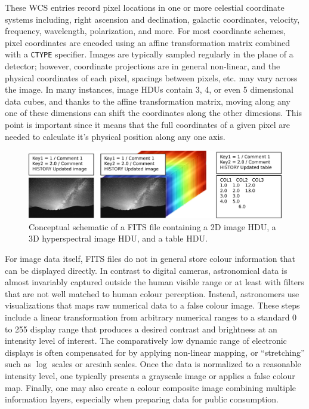 \documentclass{juliacon}
\begin{document}
These WCS entries record pixel locations in one or more celestial coordinate systems including, right ascension and declination, galactic coordinates, velocity, frequency, wavelength, polarization, and more.
For most coordinate schemes, pixel coordinates are encoded using an affine transformation matrix combined with a \verb|CTYPE| specifier. Images are typically sampled regularly in the plane of a detector; however, coordinate projections are in general non-linear, and the physical coordinates of each pixel, spacings between pixels, etc. may vary across the image.
In many instances, image HDUs contain 3, 4, or even 5 dimensional data cubes, and thanks to the affine transformation matrix, moving along any one of these dimensions can shift the coordinates along the other dimesions. This point is important since it means that the full coordinates of a given pixel are needed to calculate it's physical position along any one axis.


\begin{figure}[t]
    \centerline{\includegraphics[width=\columnwidth]{fits-schematic.pdf}}
    \caption{Conceptual schematic of a FITS file containing a 2D image HDU, a 3D hyperspectral image HDU, and a table HDU.}
        \label{fig:fits-schematic}
\end{figure}

For image data itself, FITS files do not in general store colour information that can be displayed directly. In contrast to digital cameras, astronomical data is almost invariably captured outside the human visible range or at least with filters that are not well matched to human colour perception.
Instead, astronomers use visualizations that maps raw numerical data to a false colour image.
These steps include a linear transformation from arbitrary numerical ranges to a standard 0 to 255 display range that produces a desired contrast and brightness at an intensity level of interest.
The comparatively low dynamic range of electronic displays is often compensated for by applying non-linear mapping, or ``stretching'' such as $\log$ scales or $\mathrm{arcsinh}$ scales.
Once the data is normalized to a reasonable intensity level, one typically presents a grayscale image or applies a false colour map.
Finally, one may also create a colour composite image combining multiple information layers, especially when preparing data for public consumption.
\end{document}
